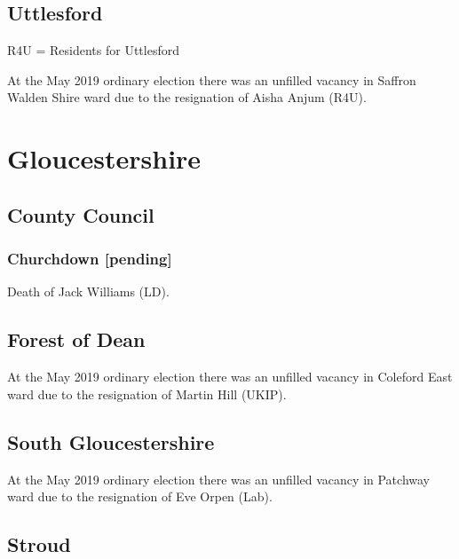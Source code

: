 \documentclass[a4paper,openany]{book}
\begin{document}
\begin{resultsiii}
\subsection*{Uttlesford}

R4U = Residents for Uttlesford

At the May 2019 ordinary election there was an unfilled vacancy in Saffron Walden Shire ward due to the resignation of Aisha Anjum (R4U).

\section{Gloucestershire}

\subsection*{County Council}

\subsubsection*{Churchdown \hspace*{\fill}\nolinebreak[1]%
	\enspace\hspace*{\fill}
	[pending]}


Death of Jack Williams (LD).

\subsection*{Forest of Dean}

At the May 2019 ordinary election there was an unfilled vacancy in Coleford East ward due to the resignation of Martin Hill (UKIP).

\subsection*{South Gloucestershire}

At the May 2019 ordinary election there was an unfilled vacancy in Patchway ward due to the resignation of Eve Orpen (Lab).

\subsection*{Stroud}


\end{resultsiii}
\end{document}
